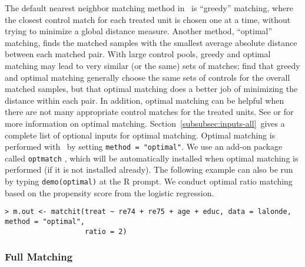 The default nearest neighbor matching method in \MatchIt\ is
``greedy'' matching, where the closest control match for each treated
unit is chosen one at a time, without trying to minimize a global
distance measure.  Another method, ``optimal'' matching, finds the
matched samples with the smallest average absolute distance between
each matched pair.  With large control pools, greedy and optimal
matching may lead to very similar (or the same) sets of matches;
\citet{GuRos93} find that greedy and optimal matching generally choose
the same sets of controls for the overall matched samples, but that
optimal matching does a better job of minimizing the distance within
each pair.  In addition, optimal matching can be helpful when there
are not many appropriate control matches for the treated units.  See
\cite{GuRos93} or \cite{Rosenbaum02} for more information on optimal
matching.
Section~\ref{subsubsec:inputs-all}~gives a complete list of optional inputs for optimal matching.  Optimal
matching is performed with \MatchIt\ by setting \texttt{method =
  "optimal"}.  We use an add-on package called \texttt{optmatch}
\citep{Hansen04}, which will be automatically installed when optimal
matching is performed (if it is not installed already).  The following
example can also be run by typing {\tt demo(optimal)} at the R prompt.
We conduct optimal ratio matching based on the propensity score from
the logistic regression.
\begin{verbatim}
> m.out <- matchit(treat ~ re74 + re75 + age + educ, data = lalonde, method = "optimal", 
                   ratio = 2)
\end{verbatim}

\subsubsection{Full Matching}
\label{subsubsec:full}

